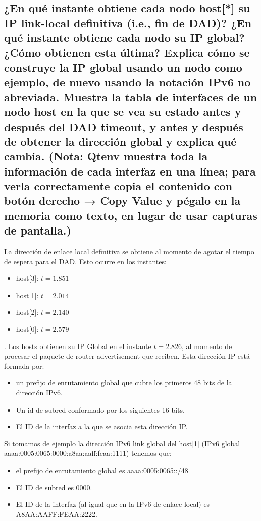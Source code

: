 \subsection{¿En qué instante obtiene cada nodo host[*] su IP link-local definitiva (i.e., fin de DAD)? ¿En qué instante obtiene cada nodo su IP global? ¿Cómo obtienen esta última? Explica cómo se construye la IP global usando un nodo como ejemplo, de nuevo usando la notación IPv6 no abreviada. Muestra la tabla de interfaces de un nodo host en la que se vea su estado antes y después del DAD timeout, y antes y después de obtener la dirección global y explica qué cambia. (Nota: Qtenv muestra toda la información de cada interfaz en una línea; para verla correctamente copia el contenido con botón derecho → Copy Value y pégalo en la memoria como texto, en lugar de usar capturas de pantalla.)}
 \begin{flushleft}
     La dirección de enlace local definitiva se obtiene al momento de agotar el tiempo de espera para el DAD. Esto ocurre en los instantes:
\begin{itemize}
    \item host[3]: \(t=1.851\)
    \item host[1]: \(t=2.014\)
    \item host[2]: \(t=2.140\)
    \item host[0]: \(t=2.579\)
\end{itemize}. 
Los hosts obtienen su IP Global en el instante \(t= 2.826\), al momento de procesar el paquete de router advertisement que reciben. Esta dirección IP está formada por:
\begin{itemize}
    \item un prefijo de enrutamiento global que cubre los primeros 48 bits de la dirección IPv6.
    \item Un id de subred conformado por los siguientes 16 bits.
    \item El ID de la interfaz a la que se asocia esta dirección IP.
\end{itemize}

Si tomamos de ejemplo la dirección IPv6 link global del host[1] (IPv6 global aaaa:0005:0065:0000:a8aa:aaff:feaa:1111) tenemos que:
\begin{itemize}
    \item el prefijo de enrutamiento global es aaaa:0005:0065::/48
    \item El ID de subred es 0000.
    \item El ID de la interfaz (al igual que en la IPv6 de enlace local) es A8AA:AAFF:FEAA:2222.
\end{itemize}



\end{flushleft}
